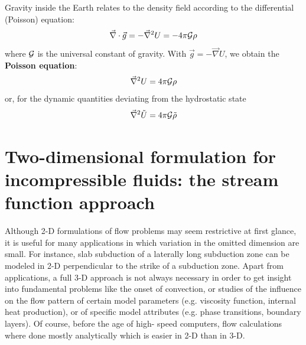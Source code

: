 Gravity inside the Earth relates to the density field according to the differential (Poisson) equation:
\begin{equation}
\vec\nabla \cdot \vec{g} = - \vec\nabla^2 U = -4\pi {\cal G} \rho
\end{equation}
where ${\cal G}$ is the universal constant of gravity. With $\vec{g}=-\vec\nabla U$, 
we obtain the {\bf Poisson equation}:
\begin{equation}
\vec\nabla^2 U = 4\pi {\cal G} \rho
\label{eq:md35}
\end{equation}
or, for the dynamic quantities deviating from the hydrostatic state
\begin{equation}
\vec\nabla^2 {\tilde U} = 4\pi {\cal G} {\tilde \rho}
\label{eq:md36}
\end{equation}


\vspace{0.5cm}
\vspace{0.5cm}

\section{Two-dimensional formulation for incompressible fluids: the stream function approach}

Although 2-D formulations of flow problems may seem restrictive at first glance, it is
useful for many applications in which variation in the omitted dimension are small. For
instance, slab subduction of a laterally long subduction zone can be modeled in 2-D
perpendicular to the strike of a subduction zone. Apart from applications, a full 3-D
approach is not always necessary in order to get insight into fundamental problems like
the onset of convection, or studies of the influence on the flow pattern of certain model
parameters (e.g. viscosity function, internal heat production), or of specific model
attributes (e.g. phase transitions, boundary layers). Of course, before the age of high-
speed computers, flow calculations where done mostly analytically which is easier in 2-D
than in 3-D.

